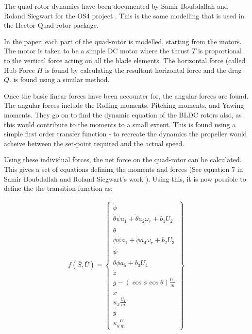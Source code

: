 \documentclass[BTech]{iitmdiss}
\begin{document}
The quad-rotor dynamics have been documented by Samir Boubdallah and Roland Siegwart for the OS4 project \cite{QuadrotorDynamics}. This is the same modelling that is used in the Hector Quad-rotor package.

In the paper, each part of the quad-rotor is modelled, starting from the motors. The motor is taken to be a simple DC motor where the thrust $T$ is proportional to the vertical force acting on all the blade elements. The horizontal force (called Hub Force $H$ is found by calculating the resultant horizontal force and the drag $Q$. is found using a similar method.

Once the basic linear forces have been accounter for, the angular forces are found. The angular forces include the Rolling moments, Pitching moments, and Yawing moments. They go on to find the dynamic equation of the BLDC rotors also, as this would contribute to the moments to a small extent. This is found using a simple first order transfer function - to recreate the dynamics the propeller would acheive between the set-point required and the actual speed.

Using these individual forces, the net force on the quad-rotor can be calculated. This gives a set of equations defining the moments and forces (See equation 7 in Samir Boubdallah and Roland Siegwart's work \cite{QuadrotorDynamics}). Using this, it is now possible to define the the transition function as:

\begin{equation} \begin{split}
  f(\bar{S}, \bar{U}) = \left\{
    \begin{array}{c}
      \dot{\phi} \\
      \dot{\theta} \dot{\psi} a_{1} + \dot{\theta} a_{2} \omega_{r} + b_{1} U_{2} \\
      \dot{\theta} \\
      \dot{\phi} \dot{\psi} a_{1} + \dot{\phi} a_{4} \omega_{r} + b_{2} U_{3} \\
      \dot{\psi} \\
      \dot{\theta} \dot{\phi} a_{5} + b_{3} U_{4} \\
      \dot{z} \\
      g  - (\cos{\phi} \cos{\theta})\frac{U_{1}}{m} \\
      \dot{x} \\
      u_{x} \frac{U_{1}}{m} \\
      \dot{y} \\
      u_{y} \frac{U_{1}}{m}
    \end{array}
  \right\}
\end{split} \end{equation}
\end{document}
